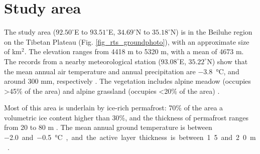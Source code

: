 \documentclass[authoryear,preprint,review,12pt]{elsarticle}
\begin{document}
\section{Study area}
\label{sec_studyarea}
The study area ($92.50^\circ$E to $93.51^\circ$E, $34.69^\circ$N to $35.18^\circ$N) is in the Beiluhe region on the Tibetan Plateau (Fig. \ref{fig_rts_groundphoto}), with an approximate size of  km$^2$. The elevation ranges from 4418 m to 5320 m, with a mean of 4673 m. The records from a nearby meteorological station ($93.08^\circ$E, $35.22^\circ$N) show that the mean annual air temperature and annual precipitation are \SI{-3.8}{\celsius}, and around 300 mm, respectively \citep{luo_thermokarst_2015}. The vegetation includes alpine meadow (occupies \textgreater 45\% of the area) and alpine grassland (occupies \textless 20\% of the area) \citep{luo_thermokarst_2015}. 

Most of this area is underlain by ice-rich permafrost: 70\% of the area  a volumetric ice content higher than 30\%, 
and the thickness of permafrost ranges from 20 to 80 m \citep{zhou_geocryology_2000, luo_thermokarst_2015}.  The mean annual ground temperature  is between \SI{-2.0} and \SI{-0.5}{\celsius}, and the active layer thickness is between 1.5 and 2.0 m \citep{zhou_geocryology_2000, luo_thermokarst_2015, wu2010changes, wu2015changes}. %
\end{document}
